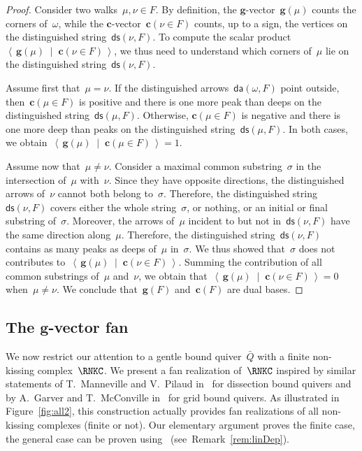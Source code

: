 \documentclass{amsart}
\theoremstyle{definition}
\renewcommand{\b}[1]{\mathbf{#1}} %
\newcommand{\dotprod}[2]{\left\langle \, #1 \; \middle| \; #2 \, \right\rangle} %
\newcommand{\fref}[1]{Figure~\ref{#1}} %
\newcommand{\distinguishedArrows}[2]{\mathsf{da}(#1,#2)} %
\newcommand{\distinguishedString}[2]{\mathsf{ds}(#1,#2)} %
\newcommand{\gvector}[1]{\mathbf{g}(#1)} %
\newcommand{\gvectors}[1]{\mathbf{g}(#1)} %
\newcommand{\cvector}[2]{\mathbf{c}(#1 \in #2)} %
\newcommand{\cvectors}[1]{\mathbf{c}(#1)} %
\begin{document}
\begin{proof}
Consider two walks~$\mu, \nu \in F$.
By definition, the $\b{g}$-vector~$\gvector{\mu}$ counts the corners of~$\omega$, while the $\b{c}$-vector~$\cvector{\nu}{F}$ counts, up to a sign, the vertices on the distinguished string~$\distinguishedString{\nu}{F}$. 
To compute the scalar product~$\dotprod{\gvector{\mu}}{\cvector{\nu}{F}}$, we thus need to understand which corners of~$\mu$ lie on the distinguished string~$\distinguishedString{\nu}{F}$.

Assume first that~$\mu = \nu$. If the distinguished arrows~$\distinguishedArrows{\omega}{F}$ point outside, then~$\cvector{\mu}{F}$ is positive and there is one more peak than deeps on the distinguished string~$\distinguishedString{\mu}{F}$.
Otherwise, ${\cvector{\mu}{F}}$ is negative and there is one more deep than peaks on the distinguished string~$\distinguishedString{\mu}{F}$.
In both cases, we obtain~$\dotprod{\gvector{\mu}}{\cvector{\mu}{F}} = 1$.

Assume now that~$\mu \ne \nu$.
Consider a maximal common substring~$\sigma$ in the intersection of~$\mu$ with~$\nu$.
Since they have opposite directions, the distinguished arrows of~$\nu$ cannot both belong to~$\sigma$.
Therefore, the distinguished string~$\distinguishedString{\nu}{F}$ covers either the whole string~$\sigma$, or nothing, or an initial or final substring of~$\sigma$.
Moreover, the arrows of~$\mu$ incident to but not in~$\distinguishedString{\nu}{F}$ have the same direction along~$\mu$.
Therefore, the distinguished string~$\distinguishedString{\nu}{F}$ contains as many peaks as deeps of~$\mu$ in~$\sigma$.
We thus showed that~$\sigma$ does not contributes to~$\dotprod{\gvector{\mu}}{\cvector{\nu}{F}}$.
Summing the contribution of all common substrings of~$\mu$ and~$\nu$, we obtain that~$\dotprod{\gvector{\mu}}{\cvector{\nu}{F}} = 0$ when~$\mu \ne \nu$.
We conclude that~$\gvectors{F}$ and~$\cvectors{F}$ are dual bases.
\end{proof}

\subsection{The $\b{g}$-vector fan}
\label{subsec:gvectorFan}

We now restrict our attention to a gentle bound quiver~$\bar Q$ with a finite non-kissing complex~$\RNKC$.
We present a fan realization of~$\RNKC$ inspired by similar statements of T.~Manneville and V.~Pilaud in~\cite{MannevillePilaud-accordion} for dissection bound quivers and by A.~Garver and T.~McConville in~\cite{GarverMcConville-grid} for grid bound quivers.
As illustrated in \fref{fig:all2}, this construction actually provides fan realizations of all non-kissing complexes (finite or not).
Our elementary argument proves the finite case, the general case can be proven using~\cite{DehyKeller, DemonetIyamaJasso} (see~Remark~\ref{rem:linDep}).
\end{document}

